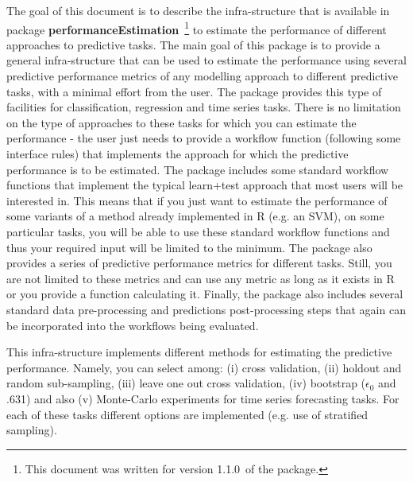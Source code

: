 \documentclass[10pt,a4paper]{article}\usepackage[]{graphicx}\usepackage[]{color}
\newcommand{\PE}{package \textbf{performanceEstimation}\ }
\newcommand{\PEversion}{1.1.0\ }
\begin{document}
The goal of this document is to describe the infra-structure that is
available in \PE\footnote{This document was written for version \PEversion of the package.} to estimate the performance of different approaches
to predictive tasks.  The main goal of this package is to provide a
general infra-structure that can be used to estimate the performance
using several predictive performance metrics of any modelling approach
to different predictive tasks, with a minimal effort from the
user. The package provides this type of facilities for classification,
regression and time series tasks. There is no limitation on the type
of approaches to these tasks for which you can estimate the
performance - the user just needs to provide a workflow function
(following some interface rules) that implements the approach for
which the predictive performance is to be estimated. The package
includes some standard workflow functions that implement the typical
learn+test approach that most users will be interested
in. This means that if you just want to estimate the performance of
some variants of a method already implemented in R (e.g. an SVM), on
some particular tasks, you will be able to use these standard workflow
functions and thus your required input will be limited to the minimum. The
package also provides a series of predictive performance metrics for
different tasks. Still, you are not limited to these metrics and can
use any metric as long as it exists in R or you provide a function
calculating it. Finally, the package also
includes several standard data pre-processing and predictions
post-processing steps that again can be incorporated into the
workflows being evaluated.  

This infra-structure implements different methods for estimating the
predictive performance. Namely, you can select among: (i) cross
validation, (ii) holdout and random sub-sampling, (iii) leave one out
cross validation, (iv)  bootstrap ($\epsilon_0$ and .631) and also (v)
Monte-Carlo experiments for time series forecasting tasks. For each of
these tasks different options are implemented (e.g. use of stratified
sampling).
\end{document}
